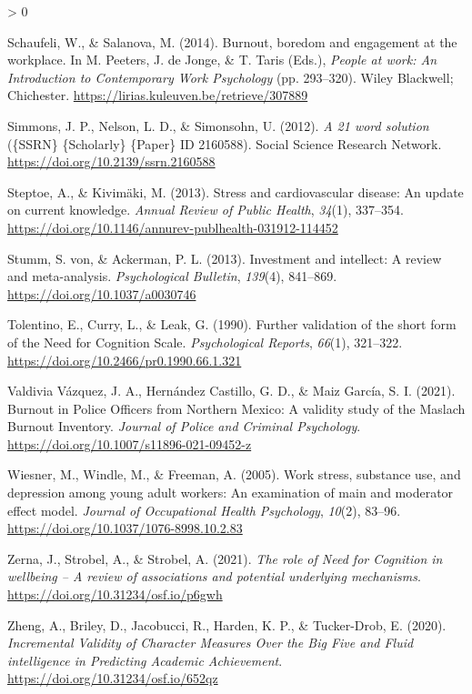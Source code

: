 \documentclass[
  english,
  man]{apa6}
\newlength{\cslhangindent}
\newenvironment{CSLReferences}[2] %
 {%
  \setlength{\parindent}{0pt}
  \ifodd #1 \everypar{\setlength{\hangindent}{\cslhangindent}}\ignorespaces\fi
  \ifnum #2 > 0
  \setlength{\parskip}{#2\baselineskip}
  \fi
 }%
 {}
\begin{document}
\begin{CSLReferences}{1}{0}
\leavevmode\hypertarget{ref-Schaufeli2014}{}%
Schaufeli, W., \& Salanova, M. (2014). Burnout, boredom and engagement at the workplace. In M. Peeters, J. de Jonge, \& T. Taris (Eds.), \emph{People at work: {An} {Introduction} to {Contemporary} {Work} {Psychology}} (pp. 293--320). Wiley Blackwell; Chichester. \url{https://lirias.kuleuven.be/retrieve/307889}

\leavevmode\hypertarget{ref-Simmons2012}{}%
Simmons, J. P., Nelson, L. D., \& Simonsohn, U. (2012). \emph{A 21 word solution} (\{SSRN\} \{Scholarly\} \{Paper\} ID 2160588). Social Science Research Network. \url{https://doi.org/10.2139/ssrn.2160588}

\leavevmode\hypertarget{ref-Steptoe2013}{}%
Steptoe, A., \& Kivimäki, M. (2013). Stress and cardiovascular disease: An update on current knowledge. \emph{Annual Review of Public Health}, \emph{34}(1), 337--354. \url{https://doi.org/10.1146/annurev-publhealth-031912-114452}

\leavevmode\hypertarget{ref-Stumm2013}{}%
Stumm, S. von, \& Ackerman, P. L. (2013). Investment and intellect: A review and meta-analysis. \emph{Psychological Bulletin}, \emph{139}(4), 841--869. \url{https://doi.org/10.1037/a0030746}

\leavevmode\hypertarget{ref-Tolentino1990}{}%
Tolentino, E., Curry, L., \& Leak, G. (1990). Further validation of the short form of the {Need} for {Cognition} {Scale}. \emph{Psychological Reports}, \emph{66}(1), 321--322. \url{https://doi.org/10.2466/pr0.1990.66.1.321}

\leavevmode\hypertarget{ref-ValdiviaVazquez2021}{}%
Valdivia Vázquez, J. A., Hernández Castillo, G. D., \& Maiz García, S. I. (2021). Burnout in {Police} {Officers} from {Northern} {Mexico}: {A} validity study of the {Maslach} {Burnout} {Inventory}. \emph{Journal of Police and Criminal Psychology}. \url{https://doi.org/10.1007/s11896-021-09452-z}

\leavevmode\hypertarget{ref-Wiesner2005}{}%
Wiesner, M., Windle, M., \& Freeman, A. (2005). Work stress, substance use, and depression among young adult workers: An examination of main and moderator effect model. \emph{Journal of Occupational Health Psychology}, \emph{10}(2), 83--96. \url{https://doi.org/10.1037/1076-8998.10.2.83}

\leavevmode\hypertarget{ref-Zerna2021}{}%
Zerna, J., Strobel, A., \& Strobel, A. (2021). \emph{The role of {Need} for {Cognition} in wellbeing -- {A} review of associations and potential underlying mechanisms}. \url{https://doi.org/10.31234/osf.io/p6gwh}

\leavevmode\hypertarget{ref-Zheng2020}{}%
Zheng, A., Briley, D., Jacobucci, R., Harden, K. P., \& Tucker-Drob, E. (2020). \emph{Incremental {Validity} of {Character} {Measures} {Over} the {Big} {Five} and {Fluid} intelligence in {Predicting} {Academic} {Achievement}}. \url{https://doi.org/10.31234/osf.io/652qz}

\end{CSLReferences}

\endgroup
\end{document}
